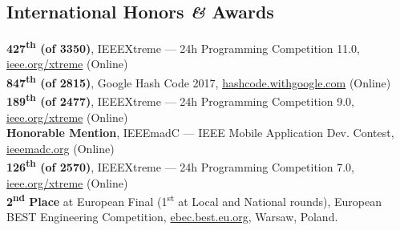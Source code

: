 \documentclass[10pt, a4paper]{article}
\newcommand{\years}[1]{\marginnote{\raggedleft\footnotesize #1}}
\begin{document}
\subsection*{International Honors \textit{\&} Awards}


\years{2017}  
\textbf{427\textsuperscript{th} \small{(of 3350)}}, IEEEXtreme --- 24h Programming Competition 11.0, 
\href{http://sites.ieee.org/xtreme/}{ieee.org/xtreme} (Online)
\\[0.42em]
\textbf{847\textsuperscript{th} \small{(of 2815)}}, Google Hash Code 2017, 
\href{http://hashcode.withgoogle.com}{hashcode.withgoogle.com} (Online)
\\[0.42em]
\years{2015}  
\textbf{189\textsuperscript{th} \small{(of 2477)}}, IEEEXtreme --- 24h Programming Competition 9.0, 
\href{http://sites.ieee.org/xtreme/}{ieee.org/xtreme} (Online)
\\[0.42em]
\years{2014} 
\textbf{Honorable Mention}, IEEEmadC --- IEEE Mobile Application Dev. Contest, \href{http://ieeemadc.org}{ieeemadc.org} (Online)
\\[0.42em]
\years{2013}  
\textbf{126\textsuperscript{th} \small{(of 2570)}}, IEEEXtreme --- 24h Programming Competition 7.0, 
\href{http://sites.ieee.org/xtreme/}{ieee.org/xtreme} (Online)
\\[0.42em]
\textbf{2\textsuperscript{nd} Place} at European Final (1\textsuperscript{st} at Local and National rounds), European BEST Engineering Competition, \href{http://ebec.best.eu.org}{ebec.best.eu.org}, Warsaw, Poland.
\end{document}
